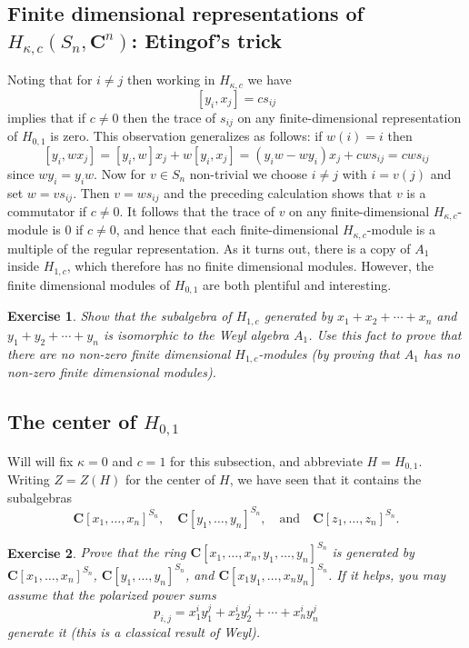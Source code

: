 \documentclass[12pt, reqno]{amsart}
\numberwithin{equation}{section}
\theoremstyle{definition}
\theoremstyle{plain}
\newtheorem{exercise}{Exercise}
\newcommand{\CC}{\mathbf{C}}
\begin{document}
\subsection{Finite dimensional representations of $H_{\kappa,c}(S_n,\CC^n)$: Etingof's trick} 
Noting that for $i \neq j$ then working in $H_{\kappa,c}$ we have
$$[y_i,x_j]=c s_{ij}$$ implies that if $c \neq 0$ then the trace of $s_{ij}$ on any finite-dimensional representation of $H_{0,1}$ is zero. This observation generalizes as follows: if $w(i)=i$ then $$[y_i,w x_j]=[y_i,w]x_j+w[y_i,x_j]=(y_i w-wy_i)x_j+c w s_{ij}=c w s_{ij}$$ since $wy_i=y_i w$. Now for $v \in S_n$ non-trivial we choose $i \neq j$ with $i=v(j)$ and set $w=v s_{ij}$. Then $v=w s_{ij}$ and the preceding calculation shows that $v$ is a commutator if $c \neq 0$. It follows that the trace of $v$ on any finite-dimensional $H_{\kappa,c}$-module is $0$ if $c \neq 0$, and hence that each finite-dimensional $H_{\kappa,c}$-module is a multiple of the regular representation. As it turns out, there is a copy of $A_1$ inside $H_{1,c}$, which therefore has no finite dimensional modules. However, the finite dimensional modules of $H_{0,1}$ are both plentiful and interesting.

\begin{exercise}
Show that the subalgebra of $H_{1,c}$ generated by $x_1+x_2+\cdots+x_n$ and $y_1+y_2+\cdots+y_n$ is isomorphic to the Weyl algebra $A_1$. Use this fact to prove that there are no non-zero finite dimensional $H_{1,c}$-modules (by proving that $A_1$ has no non-zero finite dimensional modules).
\end{exercise}

\subsection{The center of $H_{0,1}$} Will will fix $\kappa=0$ and $c=1$ for this subsection, and abbreviate $H=H_{0,1}$. Writing $Z=Z(H)$ for the center of $H$, we have seen that it contains the subalgebras $$\CC[x_1,\dots,x_n]^{S_n}, \quad \CC[y_1,\dots,y_n]^{S_n}, \quad \text{and} \quad \CC[z_1,\dots,z_n]^{S_n}.$$ 

\begin{exercise}
Prove that the ring $\CC[x_1,\dots,x_n,y_1,\dots,y_n]^{S_n}$ is generated by $\CC[x_1,\dots,x_n]^{S_n}$, $\CC[y_1,\dots,y_n]^{S_n}$, and $\CC[x_1 y_1,\dots,x_n y_n]^{S_n}$. If it helps, you may assume that the \emph{polarized power sums}
$$p_{i,j}=x_1^i y_1^j+x_2^i y_2^j+\cdots+x_n^i y_n^j$$ generate it (this is a classical result of Weyl).
\end{exercise}
\end{document}
